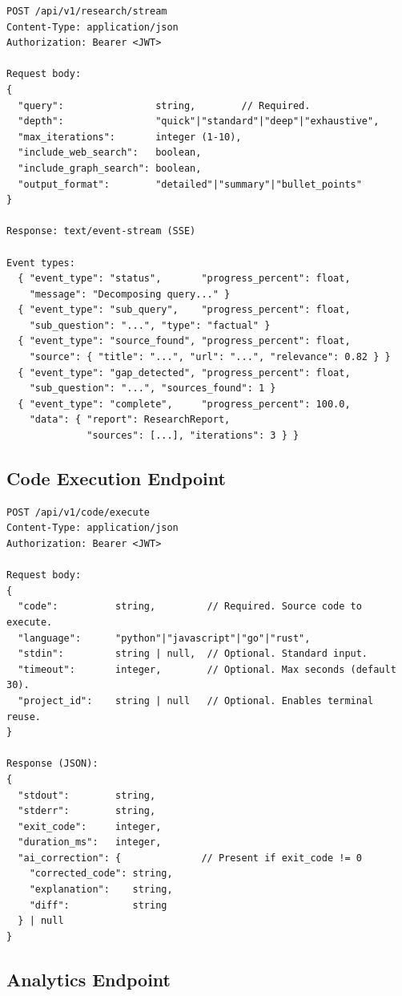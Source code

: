 \begin{verbatim}
POST /api/v1/research/stream
Content-Type: application/json
Authorization: Bearer <JWT>

Request body:
{
  "query":                string,        // Required.
  "depth":                "quick"|"standard"|"deep"|"exhaustive",
  "max_iterations":       integer (1-10),
  "include_web_search":   boolean,
  "include_graph_search": boolean,
  "output_format":        "detailed"|"summary"|"bullet_points"
}

Response: text/event-stream (SSE)

Event types:
  { "event_type": "status",       "progress_percent": float,
    "message": "Decomposing query..." }
  { "event_type": "sub_query",    "progress_percent": float,
    "sub_question": "...", "type": "factual" }
  { "event_type": "source_found", "progress_percent": float,
    "source": { "title": "...", "url": "...", "relevance": 0.82 } }
  { "event_type": "gap_detected", "progress_percent": float,
    "sub_question": "...", "sources_found": 1 }
  { "event_type": "complete",     "progress_percent": 100.0,
    "data": { "report": ResearchReport,
              "sources": [...], "iterations": 3 } }
\end{verbatim}

\subsection{Code Execution Endpoint}
\label{sec:code-api}

\begin{verbatim}
POST /api/v1/code/execute
Content-Type: application/json
Authorization: Bearer <JWT>

Request body:
{
  "code":          string,         // Required. Source code to execute.
  "language":      "python"|"javascript"|"go"|"rust",
  "stdin":         string | null,  // Optional. Standard input.
  "timeout":       integer,        // Optional. Max seconds (default 30).
  "project_id":    string | null   // Optional. Enables terminal reuse.
}

Response (JSON):
{
  "stdout":        string,
  "stderr":        string,
  "exit_code":     integer,
  "duration_ms":   integer,
  "ai_correction": {              // Present if exit_code != 0
    "corrected_code": string,
    "explanation":    string,
    "diff":           string
  } | null
}
\end{verbatim}

\subsection{Analytics Endpoint}
\label{sec:analytics-api}

